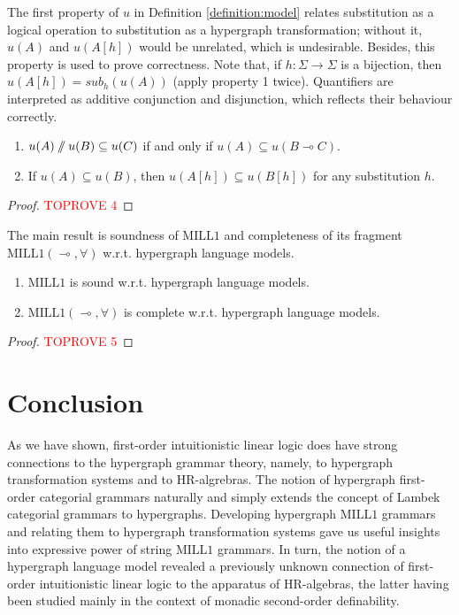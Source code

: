 \documentclass[a4paper,UKenglish,cleveref, autoref, thm-restate,pdfa]{lipics-v2021}
\newcommand{\limpl}{\multimap}
\newcommand{\MILLFO}{\mathrm{MILL}1}
\newcommand{\pc}{\mathbin{/\mkern-6mu/}}
\newcommand{\sub}{\mathit{sub}}
\begin{document}
The first property of $u$ in Definition \ref{definition:model} relates substitution as a logical operation to substitution as a hypergraph transformation; without it, $u(A)$ and $u(A[h])$ would be unrelated, which is undesirable. Besides, this property is used to prove correctness. Note that, if $h:\Sigma \to \Sigma$ is a bijection, then $u(A[h]) = \sub_h(u(A))$ (apply property 1 twice). Quantifiers are interpreted as additive conjunction and disjunction, which reflects their behaviour correctly. 
\begin{lemma}\label{lemma:val-sub-monotone}
	\leavevmode
	\begin{enumerate}
		\item $u(A) \pc u(B) \subseteq u(C)$ if and only if $u(A) \subseteq u(B \limpl C)$.
		\item If $u(A) \subseteq u(B)$, then $u(A[h]) \subseteq u(B[h])$ for any substitution $h$.
	\end{enumerate}
\end{lemma}
\begin{proof}\textcolor{red}{TOPROVE 4}\end{proof}

The main result is soundness of $\MILLFO$ and completeness of its fragment $\MILLFO(\limpl,\forall)$ w.r.t. hypergraph language models.
\begin{theorem}\label{theorem:completeness}
	\leavevmode
	\begin{enumerate}
		\item $\MILLFO$ is sound w.r.t. hypergraph language models.
		\item $\MILLFO(\limpl,\forall)$ is complete w.r.t. hypergraph language models.
	\end{enumerate}
\end{theorem}
\begin{proof}\textcolor{red}{TOPROVE 5}\end{proof}


\section{Conclusion}\label{section:conclusion}

As we have shown, first-order intuitionistic linear logic does have strong connections to the hypergraph grammar theory, namely, to hypergraph transformation systems and to HR-algrebras. The notion of hypergraph first-order categorial grammars naturally and simply extends the concept of Lambek categorial grammars to hypergraphs. Developing hypergraph $\MILLFO$ grammars and relating them to hypergraph transformation systems gave us useful insights into expressive power of string $\MILLFO$ grammars. In turn, the notion of a hypergraph language model revealed a previously unknown connection of first-order intuitionistic linear logic to the apparatus of HR-algebras, the latter having been studied mainly in the context of monadic second-order definability.
\end{document}
